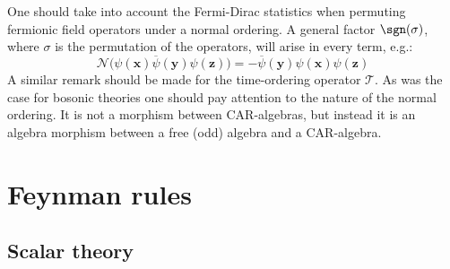     \begin{remark}
        One should take into account the Fermi-Dirac statistics when permuting fermionic field operators under a normal ordering. A general factor $\sgn(\sigma)$, where $\sigma$ is the permutation of the operators, will arise in every term, e.g.: \[\mathcal{N}\bigl(\psi(\mathbf{x})\overline\psi(\mathbf{y})\psi(\mathbf{z})\bigr) = -\overline\psi(\mathbf{y})\psi(\mathbf{x})\psi(\mathbf{z})\] A similar remark should be made for the time-ordering operator $\mathcal{T}$. As was the case for bosonic theories one should pay attention to the nature of the normal ordering. It is not a morphism between CAR-algebras, but instead it is an algebra morphism between a free (odd) algebra and a CAR-algebra.
    \end{remark}

\section{Feynman rules}
\subsection{Scalar theory}

